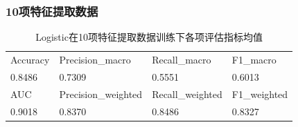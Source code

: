 \documentclass[10pt]{article}
\begin{document}
\subsubsection*{10项特征提取数据}
\begin{table}[H]
  \centering
  \caption{Logistic在10项特征提取数据训练下各项评估指标均值}
  \begin{tabular}{llll}
  \toprule
  Accuracy & Precision\_macro & Recall\_macro & F1\_macro \\
  0.8486 & 0.7309 & 0.5551 & 0.6013 \\
  \midrule
  AUC & Precision\_weighted & Recall\_weighted & F1\_weighted \\
  0.9018 & 0.8370 & 0.8486 & 0.8327 \\
  \bottomrule
  \end{tabular}
\end{table}
\end{document}
